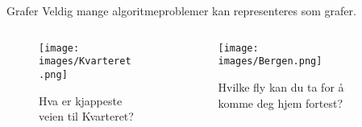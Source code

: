 \begin{frame}[fragile]{Grafer}
    Veldig mange algoritmeproblemer kan representeres som grafer.
    \begin{columns}
        \begin{column}{0.3\textwidth}
            \begin{figure}
                \texttt{[image: images/Kvarteret.png]}
                \caption{Hva er kjappeste veien til Kvarteret?}
            \end{figure}
        \end{column}
        \pause
        \begin{column}{0.3\textwidth}
            \begin{figure}
                \texttt{[image: images/Bergen.png]}
                \caption{Hvilke fly kan du ta for å komme deg hjem fortest?}
            \end{figure}
        \end{column}
        \pause
        \begin{column}{0.3\textwidth}
        \end{column}
    \end{columns}
\end{frame}


